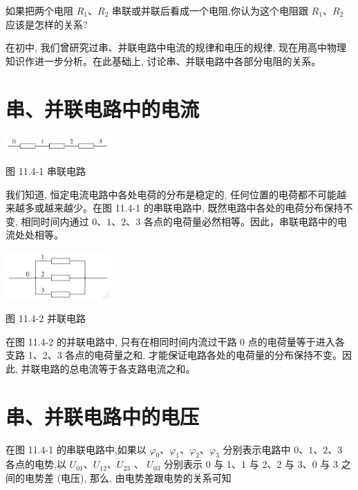 \documentclass[10pt]{article}
\begin{document}
如果把两个电阻 \({R}_{1}\text{、}{R}_{2}\) 串联或并联后看成一个电阻,你认为这个电阻跟 \({R}_{1}\text{、}{R}_{2}\) 应该是怎样的关系?

在初中, 我们曾研究过串、并联电路中电流的规律和电压的规律, 现在用高中物理知识作进一步分析。在此基础上, 讨论串、并联电路中各部分电阻的关系。

\section*{串、并联电路中的电流}

\begin{center}
\includegraphics[max width=0.3\textwidth]{images/01911d5f-8e38-70c0-b5b8-2b399bd115b6_73_947959.jpg}
\end{center}

图 11.4-1 串联电路

我们知道, 恒定电流电路中各处电荷的分布是稳定的, 任何位置的电荷都不可能越来越多或越来越少。在图 11.4-1 的串联电路中, 既然电路中各处的电荷分布保持不变, 相同时间内通过 \(0\text{、}1\text{、}2\text{、}3\) 各点的电荷量必然相等。因此，串联电路中的电流处处相等。

\begin{center}
\includegraphics[max width=0.3\textwidth]{images/01911d5f-8e38-70c0-b5b8-2b399bd115b6_73_290239.jpg}
\end{center}

图 11.4-2 并联电路

在图 11.4-2 的并联电路中, 只有在相同时间内流过干路 0 点的电荷量等于进入各支路 1、2、3 各点的电荷量之和, 才能保证电路各处的电荷量的分布保持不变。因此, 并联电路的总电流等于各支路电流之和。

\section*{串、并联电路中的电压}

在图 11.4-1 的串联电路中,如果以 \({\varphi }_{0}\text{、}{\varphi }_{1}\text{、}{\varphi }_{2}\text{、}{\varphi }_{3}\) 分别表示电路中 \(0\text{、}1\text{、}2\text{、}3\) 各点的电势,以 \({U}_{01}\text{、}{U}_{12}\text{、}{U}_{23}\) 、 \({U}_{03}\) 分别表示 0 与 1、1 与 2、2 与 3、0 与 3 之间的电势差 (电压), 那么, 由电势差跟电势的关系可知
\end{document}
